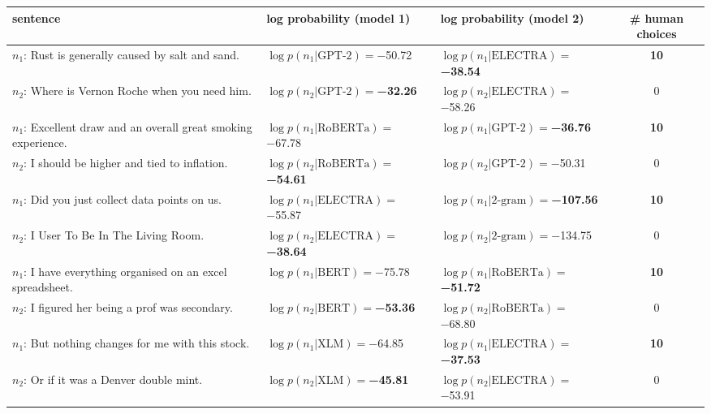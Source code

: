 \begin{tabularx}{\textwidth}{lllc}
\toprule
                                                       sentence &                               log probability (model 1) &                               log probability (model 2) &   \# human choices \\
\midrule
              $n_1$: Rust is generally caused by salt and sand. &             $\log p(n_1 | \textrm{GPT-2})=$\num{-50.72} &  $\log p(n_1 | \textrm{ELECTRA})=$\textbf{\num{-38.54}} &  \textbf{\num{10}} \\
                $n_2$: Where is Vernon Roche when you need him. &    $\log p(n_2 | \textrm{GPT-2})=$\textbf{\num{-32.26}} &           $\log p(n_2 | \textrm{ELECTRA})=$\num{-58.26} &            \num{0} \\\midrule
 $n_1$: Excellent draw and an overall great smoking experience. &           $\log p(n_1 | \textrm{RoBERTa})=$\num{-67.78} &    $\log p(n_1 | \textrm{GPT-2})=$\textbf{\num{-36.76}} &  \textbf{\num{10}} \\
               $n_2$: I should be higher and tied to inflation. &  $\log p(n_2 | \textrm{RoBERTa})=$\textbf{\num{-54.61}} &             $\log p(n_2 | \textrm{GPT-2})=$\num{-50.31} &            \num{0} \\\midrule
                 $n_1$: Did you just collect data points on us. &           $\log p(n_1 | \textrm{ELECTRA})=$\num{-55.87} &  $\log p(n_1 | \textrm{2-gram})=$\textbf{\num{-107.56}} &  \textbf{\num{10}} \\
                        $n_2$: I User To Be In The Living Room. &  $\log p(n_2 | \textrm{ELECTRA})=$\textbf{\num{-38.64}} &           $\log p(n_2 | \textrm{2-gram})=$\num{-134.75} &            \num{0} \\\midrule
    $n_1$: I have everything organised on an excel spreadsheet. &              $\log p(n_1 | \textrm{BERT})=$\num{-75.78} &  $\log p(n_1 | \textrm{RoBERTa})=$\textbf{\num{-51.72}} &  \textbf{\num{10}} \\
               $n_2$: I figured her being a prof was secondary. &     $\log p(n_2 | \textrm{BERT})=$\textbf{\num{-53.36}} &           $\log p(n_2 | \textrm{RoBERTa})=$\num{-68.80} &            \num{0} \\\midrule
             $n_1$: But nothing changes for me with this stock. &               $\log p(n_1 | \textrm{XLM})=$\num{-64.85} &  $\log p(n_1 | \textrm{ELECTRA})=$\textbf{\num{-37.53}} &  \textbf{\num{10}} \\
                      $n_2$: Or if it was a Denver double mint. &      $\log p(n_2 | \textrm{XLM})=$\textbf{\num{-45.81}} &           $\log p(n_2 | \textrm{ELECTRA})=$\num{-53.91} &            \num{0} \\\midrule

\end{tabularx}
